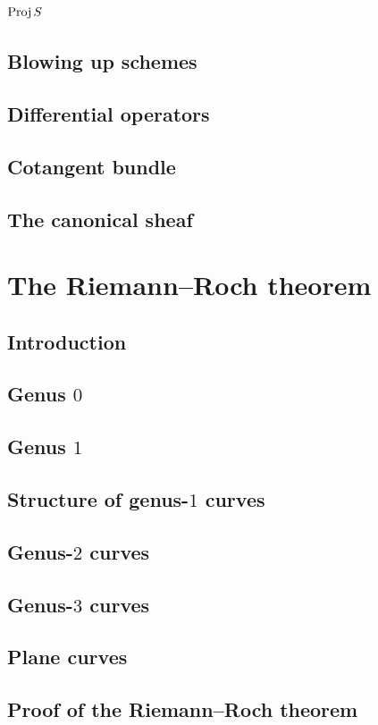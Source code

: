 \documentclass [11 pt, oneside, margin = 1 in] {article}
\begin{document}
\subsection{$\operatorname{Proj} S$}
\subsection{Blowing up schemes}
\subsection{Differential operators}
\subsection{Cotangent bundle}
\subsection{The canonical sheaf}


\section{The Riemann--Roch theorem}
\subsection{Introduction}
\subsection{Genus $0$}
\subsection{Genus $1$}
\subsection{Structure of genus-$1$ curves}
\subsection{Genus-$2$ curves}
\subsection{Genus-$3$ curves}
\subsection{Plane curves}
\subsection{Proof of the Riemann--Roch theorem}
\end{document}

